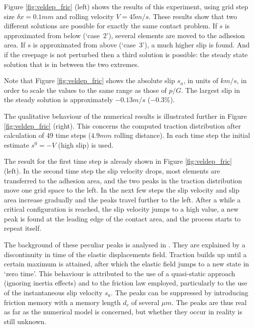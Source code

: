 \documentclass[12pt]{report}
\begin{document}
{Figure \ref{fig:veldep_fric} (left) shows the results of this experiment,
using grid step size $\delta x=0.1\unit{mm}$ and rolling velocity
$V=45\unit{m/s}$. These results show that two different solutions are
possible for exactly the same contact problem. If $s$ is approximated from
below (`case~2'), several elements are moved to the adhesion area. If
$s$ is approximated from above (`case~3'), a much higher slip is found.
And if the creepage is not perturbed then a third solution is possible:
the steady state solution that is in between the two extremes.

Note that Figure \ref{fig:veldep_fric} shows the absolute slip $s_a$, in
units of $km/s$, in order to scale the values to the same range as those
of $p/G$. The largest slip in the steady solution is approximately
$-0.13\unit{m/s}$ ($-0.3\%$).

The qualitative behaviour of the numerical results is illustrated further
in Figure \ref{fig:veldep_fric} (right). This concerns the computed traction
distribution after calculation of 49 time steps ($4.9\unit{mm}$ rolling
distance). In each time step the initial estimate $s^0=-V$ (high slip) is
used.

The result for the first time step is already shown in Figure
\ref{fig:veldep_fric} (left). In the second time step the slip velocity drops,
most elements are transferred to the adhesion area, and the two peaks in
the traction distribution move one grid space to the left. In the next few
steps the slip velocity and slip area increase gradually and the peaks
travel further to the left. After a while a critical configuration is
reached, the slip velocity jumps to a high value, a new peak is found
at the leading edge of the contact area, and the process starts to repeat
itself.

The background of these peculiar peaks is analysed in
\cite{Vollebregt2012a-quasistd}. They are explained by a discontinuity in
time of the elastic displacements field. Traction builds up until a certain
maximum is attained, after which the elastic field jumps to a new state in
`zero time'. This behaviour is attributed to the use of a quasi-static
approach (ignoring inertia effects) and to the friction law employed,
particularly to the use of the instantaneous slip velocity $s_a$. The peaks
can be suppressed by introducing friction memory with a memory length $d_c$
of several $\mu m$. The peaks are thus real as far as the numerical model
is concerned, but whether they occur in reality is still unknown.
}
\end{document}
